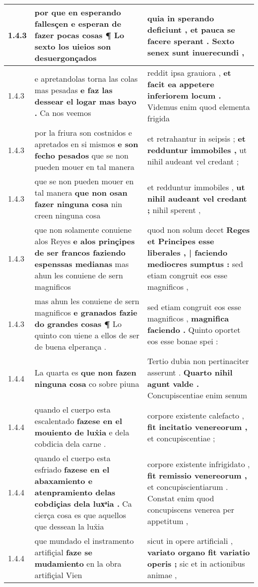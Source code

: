 \begin{tabular}{|p{1cm}|p{6.5cm}|p{6.5cm}|}
1.4.3 & por que en esperando fallesçen \textbf{ e esperan de fazer pocas cosas } ¶ Lo sexto los uieios son desuergonçados & quia in sperando deficiunt , \textbf{ et pauca se facere sperant . } Sexto senex sunt inuerecundi , \\\hline
1.4.3 & e apretandolas torna las colas mas pesadas \textbf{ e faz las dessear el logar mas bayo . } Ca nos veemos & reddit ipsa grauiora , \textbf{ et facit ea appetere inferiorem locum . } Videmus enim quod elementa frigida \\\hline
1.4.3 & por la friura son costnidos e apretados en si mismos \textbf{ e son fecho pesados } que se non pueden mouer en tal manera & et retrahantur in seipsis ; \textbf{ et redduntur immobiles , } ut nihil audeant vel credant ; \\\hline
1.4.3 & que se non pueden mouer en tal manera \textbf{ que non osan fazer ninguna cosa } nin creen ninguna cosa & et redduntur immobiles , \textbf{ ut nihil audeant vel credant ; } nihil sperent , \\\hline
1.4.3 & que non solamente conuiene alos Reyes \textbf{ e alos prinçipes de ser francos faziendo espenssas medianas } mas ahun les conuiene de sern magnificos & quod non solum decet \textbf{ Reges et Principes esse liberales , | faciendo mediocres sumptus : } sed etiam congruit eos esse magnificos , \\\hline
1.4.3 & mas ahun les conuiene de sern magnificos \textbf{ e granados fazie do grandes cosas ¶ } Lo quinto con uiene a ellos de ser de buena elperança . & sed etiam congruit eos esse magnificos , \textbf{ magnifica faciendo . } Quinto oportet eos esse bonae spei : \\\hline
1.4.4 & La quarta es \textbf{ que non fazen ninguna cosa } co sobre piuna & Tertio dubia non pertinaciter asserunt . \textbf{ Quarto nihil agunt valde . } Concupiscentiae enim senum \\\hline
1.4.4 & quando el cuerpo esta escalentado \textbf{ fazese en el mouiento de lux̉ia } e dela cobdicia dela carne . & corpore existente calefacto , \textbf{ fit incitatio venereorum , } et concupiscentiae ; \\\hline
1.4.4 & quando el cuerpo esta esfriado \textbf{ fazese en el abaxamiento e atenpramiento delas cobdiçias dela luxͣia . } Ca cierça cosa es que aquellos que dessean la lux̉ia & corpore existente infrigidato , \textbf{ fit remissio venereorum , } et concupiscientiarum . Constat enim quod concupiscens venerea per appetitum , \\\hline
1.4.4 & que mundado el instramento artifiçial \textbf{ faze se mudamiento } en la obra artifiçial Vien & sicut in opere artificiali , \textbf{ variato organo fit variatio operis ; } sic et in actionibus animae , \\\hline

\end{tabular}
